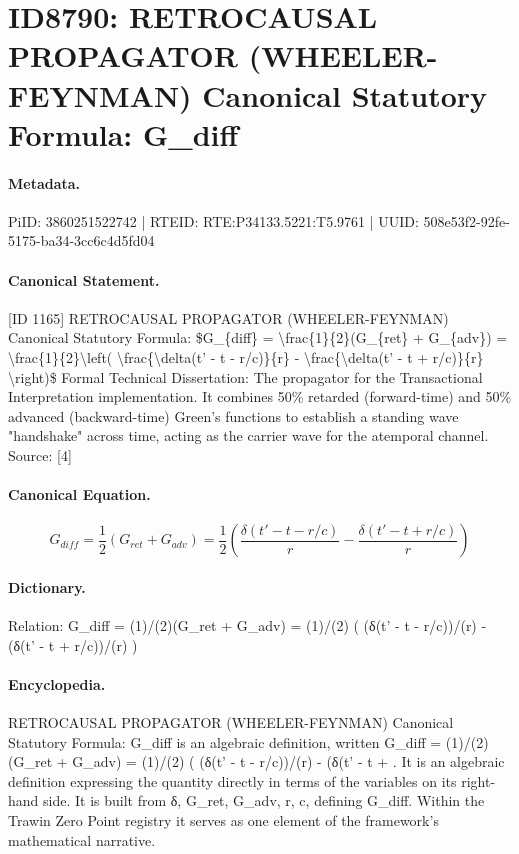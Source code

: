 \section*{ID8790: RETROCAUSAL PROPAGATOR (WHEELER-FEYNMAN) Canonical Statutory Formula: G\_diff}
\paragraph{Metadata.}
PiID: 3860251522742 | RTEID: RTE:P34133.5221:T5.9761 | UUID: 508e53f2-92fe-5175-ba34-3cc6c4d5fd04

\paragraph{Canonical Statement.}
[ID 1165] RETROCAUSAL PROPAGATOR (WHEELER-FEYNMAN) Canonical Statutory Formula: \$G\_\{diff\} = \textbackslash{}frac\{1\}\{2\}(G\_\{ret\} + G\_\{adv\}) = \textbackslash{}frac\{1\}\{2\}\textbackslash{}left( \textbackslash{}frac\{\textbackslash{}delta(t' - t - r/c)\}\{r\} - \textbackslash{}frac\{\textbackslash{}delta(t' - t + r/c)\}\{r\} \textbackslash{}right)\$ Formal Technical Dissertation: The propagator for the Transactional Interpretation implementation. It combines 50\% retarded (forward-time) and 50\% advanced (backward-time) Green's functions to establish a standing wave "handshake" across time, acting as the carrier wave for the atemporal channel. Source: [4]

\paragraph{Canonical Equation.}
\[
G_{diff} = \frac{1}{2}(G_{ret} + G_{adv}) = \frac{1}{2}\left( \frac{\delta(t' - t - r/c)}{r} - \frac{\delta(t' - t + r/c)}{r} \right)
\]

\paragraph{Dictionary.}
Relation: G\_diff = (1)/(2)(G\_ret + G\_adv) = (1)/(2) ( (δ(t' - t - r/c))/(r) - (δ(t' - t + r/c))/(r) )

\paragraph{Encyclopedia.}
RETROCAUSAL PROPAGATOR (WHEELER-FEYNMAN) Canonical Statutory Formula: G\_diff is an algebraic definition, written G\_diff = (1)/(2)(G\_ret + G\_adv) = (1)/(2) ( (δ(t' - t - r/c))/(r) - (δ(t' - t + . It is an algebraic definition expressing the quantity directly in terms of the variables on its right-hand side. It is built from δ, G\_ret, G\_adv, r, c, defining G\_diff. Within the Trawin Zero Point registry it serves as one element of the framework's mathematical narrative.
